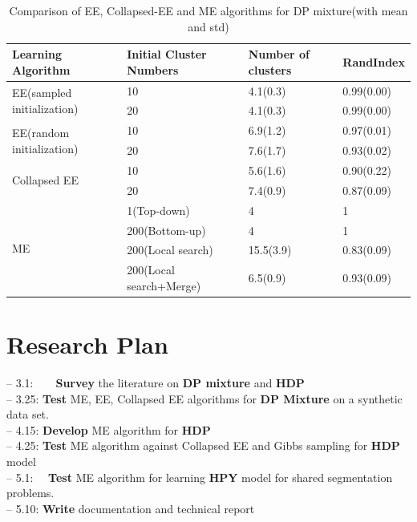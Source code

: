 \documentclass{article}
\begin{document}
\begin{table}[t]
\caption{Comparison of EE, Collapsed-EE and ME algorithms for DP mixture(with mean and std)}
\begin{center}
\begin{tabular}{|l|l|l|l|}
\hline
{\bf Learning Algorithm} &{\bf Initial Cluster Numbers} &{\bf Number of clusters}  &{\bf RandIndex} \\ 
\hline 
\multirow{2}{*}{EE(sampled initialization)} & 10 & 4.1(0.3) & 0.99(0.00) \\
					    & 20 & 4.1(0.3) & 0.99(0.00)\\
\hline
\multirow{2}{*}{EE(random initialization)}  & 10 & 6.9(1.2)&  0.97(0.01) \\
					    & 20 & 7.6(1.7)&  0.93(0.02) \\
\hline
\multirow{2}{*}{Collapsed EE}               & 10 & 5.6(1.6)&  0.90(0.22) \\
					    & 20 & 7.4(0.9)&  0.87(0.09) \\
\hline
\multirow{4}{*}{ME}                         & 1(Top-down) &    4  &  1 \\
					    & 200(Bottom-up) & 4  &  1 \\
					    & 200(Local search) & 15.5(3.9)&  0.83(0.09) \\
					    & 200(Local search+Merge) & 6.5(0.9)&  0.93(0.09) \\
\hline
\end{tabular}
\end{center}
\end{table}

\section{Research Plan}

-- 3.1:\ \ \ \ \textbf{Survey} the literature on \textbf{DP mixture} and \textbf{HDP} \\
-- 3.25: \textbf{Test} ME, EE, Collapsed EE algorithms for \textbf{DP Mixture} on a synthetic data set.\\
-- 4.15: \textbf{Develop} ME algorithm for \textbf{HDP} \\
-- 4.25: \textbf{Test} ME algorithm against Collapsed EE and Gibbs sampling for \textbf{HDP} model\\
-- 5.1: \ \ \textbf{Test} ME algorithm for learning \textbf{HPY} model for shared segmentation problems.\\
-- 5.10: \textbf{Write} documentation and technical report\\
\end{document}
